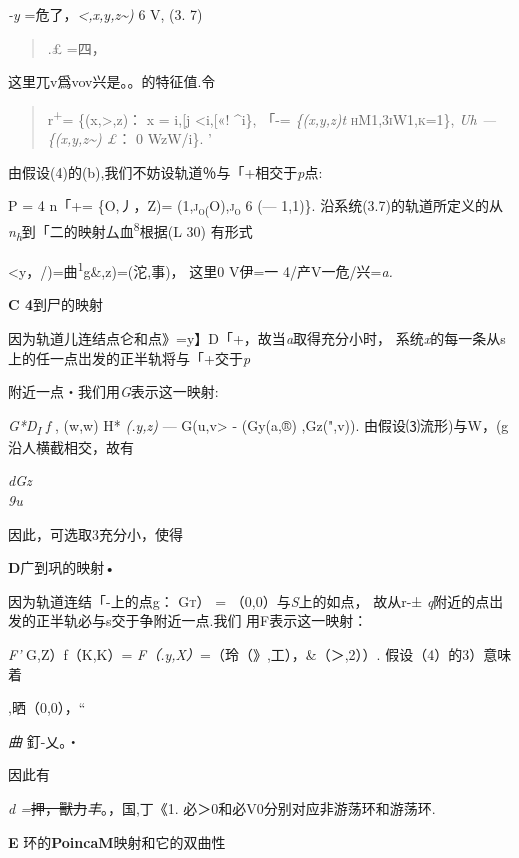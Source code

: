 \documentclass{article}
\begin{document}
\emph{-y} =危了，\emph{\textless{},x,y,z\textasciitilde{})} 6 V, (3. 7)

\begin{quote}
.£ =四，
\end{quote}

这里兀v爲vov兴是。。的特征值.令

\begin{quote}
r\textsuperscript{+}= \{(x,\textgreater{},z)： x = i,{[}j\textbar{}
\textless{}i,{[}«! \^{}i\}, 「-= \emph{\{(x,y,z)t}
\textsc{\textbar{}h\textbar{}M1,\textbar{}3i\textbar{}W1,\textbar{}k\textbar{}=1\},}
\emph{Uh --- \{(x,y,z\textasciitilde{}) £}： 0 WzW/i\}. '
\end{quote}

由假设(4)的(b),我们不妨设轨道％与「+相交于\emph{p}点:

P = 4 n「+= \{O,丿，Z)=
\textsc{(1,j\textsubscript{o(}O),j\textsubscript{o}} 6 (--- 1,1)\}.
沿系统(3.7)的轨道所定义的从\emph{n\textsubscript{h}}到「二的映射厶血\textsuperscript{8}根据(L
30) 有形式

\textless{}y，/)=曲\textsuperscript{1}g\&,z)=(沱,事)， 这里0 V伊=一
4/产V一危/兴=\emph{a.}

\textbf{C 4}到尸的映射

因为轨道儿连结点仑和点》=y】D「+，故当\emph{a}取得充分小时，
系统\emph{x}的每一条从s上的任一点岀发的正半轨将与「+交于\emph{p}

附近一点・我们用\emph{G}表示这一映射:

\emph{G*D\textsubscript{I} f} , (w,w) H* \emph{(.y,z)} ---
G(u,v\textgreater{} - (Gy(a,®) ,Gz(",v)).
由假设⑶流形)与W，(g沿人横截相交，故有

\emph{dGz\\
9u}

因此，可选取3充分小，使得

\textbf{D}广到巩的映射•

因为轨道连结「-上的点g： \textsc{Gt） =} （0,0）与\emph{S}上的如点，
故从r-± \emph{q}附近的点岀发的正半轨必与s交于争附近一点.我们
用F表示这一映射：

\emph{F'} G,Z）f（K,K）= \emph{F（.y,X）}=（玲（》,工），\&（＞,2））.
假设（4）的3）意味着

,晒（0,0），``

\emph{曲} 釘-乂。・

因此有

\emph{d =}\sout{押，獸力}\emph{丰}。，国,\textbar{}丁\textbar{}《1.
必＞0和必V0分别对应非游荡环和游荡环.

\textbf{E} 环的\textbf{PoincaM}映射和它的双曲性
\end{document}
